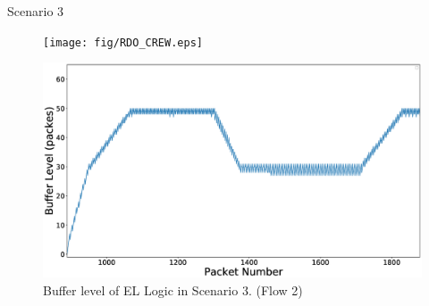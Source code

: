 \begin{subsection}{Scenario 3}
    \begin{figure}[tbh]
        \centering
        \begin{minipage}[t]{0.24\textwidth}
        \centering
        \texttt{[image: fig/RDO\_CREW.eps]}
        \caption{Result of EL Logic in Scenario 3. (Flow 2)}
        \label{EL_received_packets_S3_V2} 
        \end{minipage}
        \hfill\begin{minipage}[t]{0.23\textwidth}
        \centering
        \includegraphics[width=\textwidth]{fig/EL_scenario3_buffer.eps}
        \caption{Buffer level of EL Logic in Scenario 3. (Flow 2)}
        \label{EL_buffer_level_S3_V2} 
        \end{minipage}
        \vspace{-0.1cm}
    \end{figure}


\end{subsection}